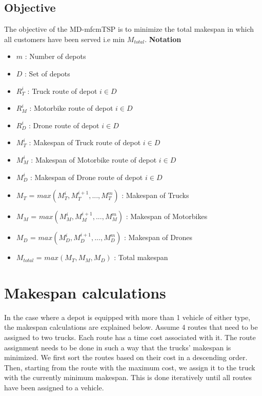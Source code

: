 \documentclass{article}
\begin{document}
	\subsection{Objective}
	The objective of the MD-mfcmTSP is to minimize the total makespan in which all customers have been served i.e min $M_{total}$.\;
	\newline
	\newline
	\textbf{Notation}\;
	\begin{itemize}
		\item $m$ : Number of depots
		\item $D$ : Set of depots
		\item $R_T^i$ : Truck route of depot $i\in D$ \;
		\item $R_M^i$ : Motorbike route of depot $i\in D$ \;
		\item $R_D^i$ : Drone route of depot $i\in D$ \;
		\item $M_T^i$ : Makespan of Truck route of depot $i\in D$ \;
		\item $M_M^i$ : Makespan of Motorbike route of depot $i\in D$ \;
		\item $M_D^i$ : Makespan of Drone route of depot $i\in D$ \;
		\item $M_T$ = $max(M_T^i, M_T^{i+1}, ..., M_T^m)$ : Makespan of Trucks \;
		\item $M_M$ = $max(M_M^i, M_M^{i+1}, ..., M_M^m)$ : Makespan of Motorbikes \;
		\item $M_D$ = $max(M_D^i, M_D^{i+1}, ..., M_D^m)$ : Makespan of Drones \;
		\item $M_{total}$ = $max(M_T, M_M, M_D)$ : Total makespan \;
	\end{itemize}
	
	\twocolumn
	\section{Makespan calculations}
	In the case where a depot is equipped with more than 1 vehicle of either type, the makespan calculations are explained below.
	Assume 4 routes that need to be assigned to two trucks. Each route has a time cost associated with it. The route assignment needs to be done in such a way that the trucks' makespan is minimized. We first sort the routes based on their cost in a descending order. Then, starting from the route with the maximum cost, we assign it to the truck with the currently minimum makespan. This is done iteratively until all routes have been assigned to a vehicle. 
	
	
\end{document}
